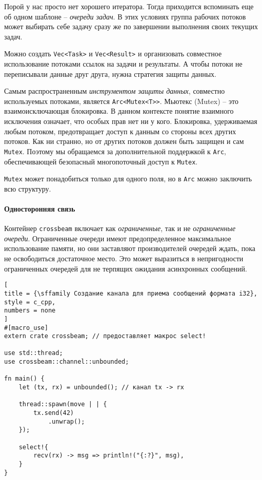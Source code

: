 \documentclass[%
	11pt,
	a4paper,
	utf8,
		]{article}
\begin{document}
Порой у нас просто нет хорошего итератора. Тогда приходится вспоминать еще об одном шаблоне -- \emph{очереди задач}. В этих условиях группа рабочих потоков может выбирать себе задачу сразу же по завершении выполнения своих текущих задач.

Можно создать \verb|Vec<Task>| и \verb|Vec<Result>| и организовать совместное использование потоками ссылок на задачи и результаты. А чтобы потоки не переписывали данные друг друга, нужна стратегия защиты данных.

Самым распространенным \emph{инструментом защиты данных}, совместно используемых потоками, является \verb|Arc<Mutex<T>>|. Мьютекс (Mutex) -- это взаимоисключающая блокировка. В данном контексте понятие взаимного исключения означает, что особых прав нет ни у кого. Блокировка, удерживаемая любым потоком, предотвращает доступ к данным со стороны всех других потоков. Как ни странно, но от других потоков должен быть защищен и сам \verb|Mutex|. Поэтому мы обращаемся за дополнительной поддержкой к \verb|Arc|, обеспечивающей безопасный многопоточный доступ к \verb|Mutex|.

\verb|Mutex| может понадобиться только для одного поля, но в \verb|Arc| можно заключить всю структуру.

\paragraph{Односторонняя связь} Контейнер \verb|crossbeam| включает как \emph{ограниченные}, так и не \emph{ограниченные очереди}. Ограниченные очереди имеют предопределенное максимальное использование памяти, но они заставляют производителей очередей ждать, пока не освободиться достаточное место. Это может выразиться в непригодности ограниченных очередей для не терпящих ожидания асинхронных сообщений.

\begin{lstlisting}[
title = {\sffamily Создание канала для приема сообщений формата i32},
style = c_cpp,
numbers = none	
]
#[macro_use]
extern crate crossbeam; // предоставляет макрос select!

use std::thread;
use crossbeam::channel::unbounded;

fn main() {
    let (tx, rx) = unbounded(); // канал tx -> rx
    
    thread::spawn(move | | {
        tx.send(42)
            .unwrap();
    });

    select!{
        recv(rx) -> msg => println!("{:?}", msg),
    }
}
\end{lstlisting}
\end{document}
